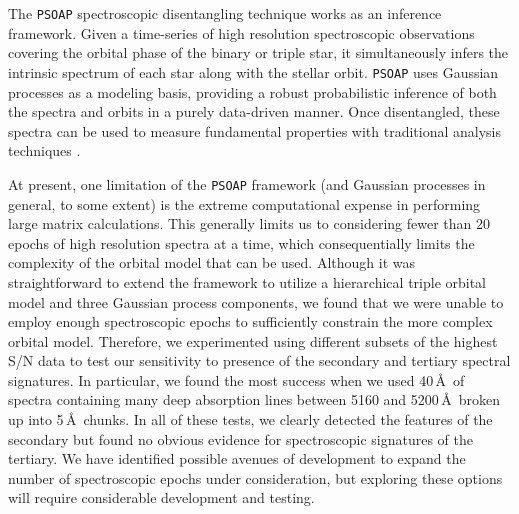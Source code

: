 \documentclass[twocolumn]{aastex61}
\begin{document}
The \texttt{PSOAP} spectroscopic disentangling technique works as an inference framework. Given a time-series of high resolution spectroscopic observations covering the orbital phase of the binary or triple star, it simultaneously infers the intrinsic spectrum of each star along with the stellar orbit. \texttt{PSOAP} uses Gaussian processes as a modeling basis, providing a robust probabilistic inference of both the spectra and orbits in a purely data-driven manner. Once disentangled, these spectra can be used to measure fundamental properties with traditional analysis techniques \citep{czekala17}.

At present, one limitation of the \texttt{PSOAP} framework (and Gaussian processes in general, to some extent) is the extreme computational expense in performing large matrix calculations. This generally limits us to considering fewer than 20 epochs of high resolution spectra at a time, which consequentially limits the complexity of the orbital model that can be used. Although it was straightforward to extend the framework to utilize a hierarchical triple orbital model and three Gaussian process components, we found that we were unable to employ enough spectroscopic epochs to sufficiently constrain the more complex orbital model. Therefore, we experimented using different subsets of the highest S/N data to test our sensitivity to presence of the secondary and tertiary spectral signatures. In particular, we found the most success when we used 40\,\AA\ of spectra containing many deep absorption lines between 5160 and 5200\,\AA\ broken up into 5\,\AA\ chunks. In all of these tests, we clearly detected the features of the secondary but found no obvious evidence for spectroscopic signatures of the tertiary. We have identified possible avenues of development to expand the number of spectroscopic epochs under consideration, but exploring these options will require considerable development and testing.
\end{document}
